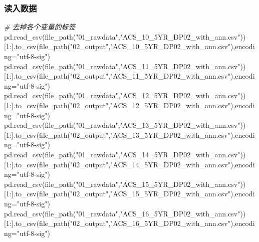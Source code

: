 \documentclass[
]{article}
\newenvironment{Shaded}{}{}
\newcommand{\CommentTok}[1]{\textcolor[rgb]{0.38,0.63,0.69}{\textit{#1}}}
\newcommand{\DecValTok}[1]{\textcolor[rgb]{0.25,0.63,0.44}{#1}}
\newcommand{\NormalTok}[1]{#1}
\newcommand{\OperatorTok}[1]{\textcolor[rgb]{0.40,0.40,0.40}{#1}}
\newcommand{\StringTok}[1]{\textcolor[rgb]{0.25,0.44,0.63}{#1}}
\begin{document}
\hypertarget{header-n201}{%
\subsubsection{读入数据}\label{header-n201}}

\begin{Shaded}
\begin{Highlighting}[]
\CommentTok{\# 去掉各个变量的标签}
\NormalTok{pd.read\_csv(file\_path(}\StringTok{"01\_rawdata"}\NormalTok{,}\StringTok{"ACS\_10\_5YR\_DP02\_with\_ann.csv"}\NormalTok{))[}\DecValTok{1}\NormalTok{:].to\_csv(file\_path(}\StringTok{"02\_output"}\NormalTok{,}\StringTok{"ACS\_10\_5YR\_DP02\_with\_ann.csv"}\NormalTok{),encoding}\OperatorTok{=}\StringTok{"utf{-}8{-}sig"}\NormalTok{)}
\NormalTok{pd.read\_csv(file\_path(}\StringTok{"01\_rawdata"}\NormalTok{,}\StringTok{"ACS\_11\_5YR\_DP02\_with\_ann.csv"}\NormalTok{))[}\DecValTok{1}\NormalTok{:].to\_csv(file\_path(}\StringTok{"02\_output"}\NormalTok{,}\StringTok{"ACS\_11\_5YR\_DP02\_with\_ann.csv"}\NormalTok{),encoding}\OperatorTok{=}\StringTok{"utf{-}8{-}sig"}\NormalTok{)}
\NormalTok{pd.read\_csv(file\_path(}\StringTok{"01\_rawdata"}\NormalTok{,}\StringTok{"ACS\_12\_5YR\_DP02\_with\_ann.csv"}\NormalTok{))[}\DecValTok{1}\NormalTok{:].to\_csv(file\_path(}\StringTok{"02\_output"}\NormalTok{,}\StringTok{"ACS\_12\_5YR\_DP02\_with\_ann.csv"}\NormalTok{),encoding}\OperatorTok{=}\StringTok{"utf{-}8{-}sig"}\NormalTok{)}
\NormalTok{pd.read\_csv(file\_path(}\StringTok{"01\_rawdata"}\NormalTok{,}\StringTok{"ACS\_13\_5YR\_DP02\_with\_ann.csv"}\NormalTok{))[}\DecValTok{1}\NormalTok{:].to\_csv(file\_path(}\StringTok{"02\_output"}\NormalTok{,}\StringTok{"ACS\_13\_5YR\_DP02\_with\_ann.csv"}\NormalTok{),encoding}\OperatorTok{=}\StringTok{"utf{-}8{-}sig"}\NormalTok{)}
\NormalTok{pd.read\_csv(file\_path(}\StringTok{"01\_rawdata"}\NormalTok{,}\StringTok{"ACS\_14\_5YR\_DP02\_with\_ann.csv"}\NormalTok{))[}\DecValTok{1}\NormalTok{:].to\_csv(file\_path(}\StringTok{"02\_output"}\NormalTok{,}\StringTok{"ACS\_14\_5YR\_DP02\_with\_ann.csv"}\NormalTok{),encoding}\OperatorTok{=}\StringTok{"utf{-}8{-}sig"}\NormalTok{)}
\NormalTok{pd.read\_csv(file\_path(}\StringTok{"01\_rawdata"}\NormalTok{,}\StringTok{"ACS\_15\_5YR\_DP02\_with\_ann.csv"}\NormalTok{))[}\DecValTok{1}\NormalTok{:].to\_csv(file\_path(}\StringTok{"02\_output"}\NormalTok{,}\StringTok{"ACS\_15\_5YR\_DP02\_with\_ann.csv"}\NormalTok{),encoding}\OperatorTok{=}\StringTok{"utf{-}8{-}sig"}\NormalTok{)}
\NormalTok{pd.read\_csv(file\_path(}\StringTok{"01\_rawdata"}\NormalTok{,}\StringTok{"ACS\_16\_5YR\_DP02\_with\_ann.csv"}\NormalTok{))[}\DecValTok{1}\NormalTok{:].to\_csv(file\_path(}\StringTok{"02\_output"}\NormalTok{,}\StringTok{"ACS\_16\_5YR\_DP02\_with\_ann.csv"}\NormalTok{),encoding}\OperatorTok{=}\StringTok{"utf{-}8{-}sig"}\NormalTok{)}

\end{Highlighting}
\end{Shaded}
\end{document}
